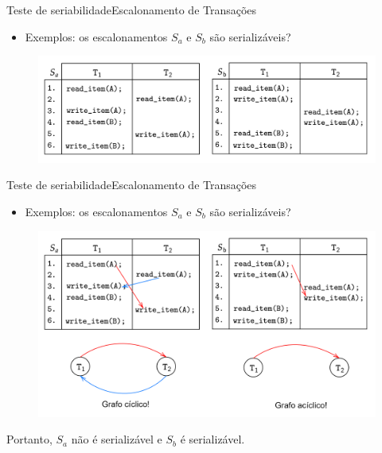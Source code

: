 \documentclass[t]{beamer}
\begin{document}

\begin{ftst}{Teste de seriabilidade}{Escalonamento de Transações}

\begin{itemize}
    \item Exemplos: os escalonamentos $S_a$ e $S_b$ são serializáveis?
\end{itemize}
\begin{figure}
    \centering
    \includegraphics[scale=0.13]{Figuras_transacoes/18.png}
\end{figure}
\end{ftst}


\begin{ftst}{Teste de seriabilidade}{Escalonamento de Transações}

\begin{itemize}
    \item Exemplos: os escalonamentos $S_a$ e $S_b$ são serializáveis?
\end{itemize}
\begin{figure}
    \centering
    \includegraphics[scale=0.11]{Figuras_transacoes/19.png}
\end{figure}
Portanto, $S_a$ não é serializável e $S_b$ é serializável.

\end{ftst}
\end{document}
